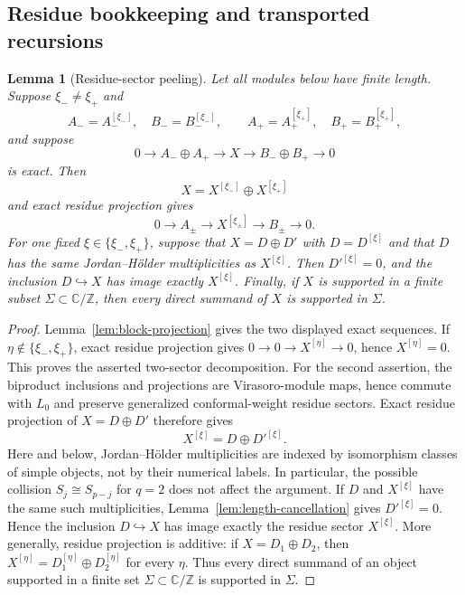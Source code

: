 \documentclass[12pt,leqno]{amsart}
\numberwithin{equation}{section}
\newtheorem{lem}[thm]{Lemma}
\def\Z{\mathbb{Z}}
\def\C{\mathbb{C}}
\begin{document}
\subsection{Residue bookkeeping and transported recursions}

\begin{lem}[Residue-sector peeling]\label{lem:residue-sector-peeling}
Let all modules below have finite length.  Suppose $\xi_-\ne\xi_+$ and
\[
 A_-=A_-^{[\xi_-]},\quad B_-=B_-^{[\xi_-]},\qquad
 A_+=A_+^{[\xi_+]},\quad B_+=B_+^{[\xi_+]},
\]
and suppose
\[
 0\longrightarrow A_-\oplus A_+\longrightarrow X
 \longrightarrow B_-\oplus B_+\longrightarrow0
\]
is exact.  Then
\[
 X=X^{[\xi_-]}\oplus X^{[\xi_+]}
\]
and exact residue projection gives
\[
 0\to A_\pm\to X^{[\xi_\pm]}\to B_\pm\to0.
\]
For one fixed $\xi\in\{\xi_-,\xi_+\}$, suppose that
$X=D\oplus D'$ with $D=D^{[\xi]}$ and that $D$ has the same
Jordan--H\"older multiplicities as $X^{[\xi]}$.  Then
$D'^{[\xi]}=0$, and the inclusion $D\hookrightarrow X$ has image exactly
$X^{[\xi]}$.  Finally, if $X$ is supported in a finite subset
$\Sigma\subset\C/\Z$, then every direct summand of $X$ is supported
in $\Sigma$.
\end{lem}

\begin{proof}
Lemma~\ref{lem:block-projection} gives the two displayed exact
sequences.  If $\eta\notin\{\xi_-,\xi_+\}$, exact residue projection gives
$0\to0\to X^{[\eta]}\to0$, hence $X^{[\eta]}=0$.  This proves the asserted
two-sector decomposition.  For the second assertion, the biproduct inclusions and projections are
Virasoro-module maps, hence commute with $L_0$ and preserve generalized
conformal-weight residue sectors.  Exact residue projection of
$X=D\oplus D'$ therefore gives
\[
 X^{[\xi]}=D\oplus D'^{[\xi]}.
\]
Here and below, Jordan--H\"older multiplicities are indexed by
isomorphism classes of simple objects, not by their numerical labels.  In
particular, the possible collision $S_j\cong S_{p-j}$ for $q=2$ does not
affect the argument.  If $D$ and $X^{[\xi]}$ have the same such
multiplicities, Lemma~\ref{lem:length-cancellation} gives
$D'^{[\xi]}=0$.  Hence the
inclusion $D\hookrightarrow X$ has image exactly the residue sector
$X^{[\xi]}$.  More generally, residue projection is additive: if
$X=D_1\oplus D_2$, then
$X^{[\eta]}=D_1^{[\eta]}\oplus D_2^{[\eta]}$ for every $\eta$.  Thus every
direct summand of an object supported in a finite set $\Sigma\subset\C/\Z$
is supported in $\Sigma$.
\end{proof}
\end{document}
